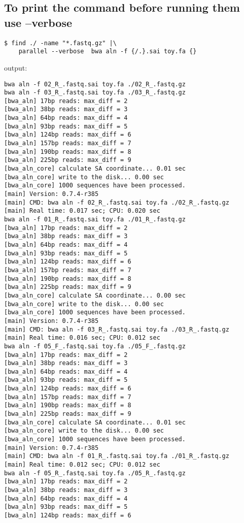 \documentclass{article}
\begin{document}
\subsection{To print the command before running them use --verbose}
\begin{lstlisting}
$ find ./ -name "*.fastq.gz" |\
	parallel --verbose  bwa aln -f {/.}.sai toy.fa {}
\end{lstlisting}
output:
\begin{lstlisting}
bwa aln -f 02_R_.fastq.sai toy.fa ./02_R_.fastq.gz
bwa aln -f 03_R_.fastq.sai toy.fa ./03_R_.fastq.gz
[bwa_aln] 17bp reads: max_diff = 2
[bwa_aln] 38bp reads: max_diff = 3
[bwa_aln] 64bp reads: max_diff = 4
[bwa_aln] 93bp reads: max_diff = 5
[bwa_aln] 124bp reads: max_diff = 6
[bwa_aln] 157bp reads: max_diff = 7
[bwa_aln] 190bp reads: max_diff = 8
[bwa_aln] 225bp reads: max_diff = 9
[bwa_aln_core] calculate SA coordinate... 0.01 sec
[bwa_aln_core] write to the disk... 0.00 sec
[bwa_aln_core] 1000 sequences have been processed.
[main] Version: 0.7.4-r385
[main] CMD: bwa aln -f 02_R_.fastq.sai toy.fa ./02_R_.fastq.gz
[main] Real time: 0.017 sec; CPU: 0.020 sec
bwa aln -f 01_R_.fastq.sai toy.fa ./01_R_.fastq.gz
[bwa_aln] 17bp reads: max_diff = 2
[bwa_aln] 38bp reads: max_diff = 3
[bwa_aln] 64bp reads: max_diff = 4
[bwa_aln] 93bp reads: max_diff = 5
[bwa_aln] 124bp reads: max_diff = 6
[bwa_aln] 157bp reads: max_diff = 7
[bwa_aln] 190bp reads: max_diff = 8
[bwa_aln] 225bp reads: max_diff = 9
[bwa_aln_core] calculate SA coordinate... 0.00 sec
[bwa_aln_core] write to the disk... 0.00 sec
[bwa_aln_core] 1000 sequences have been processed.
[main] Version: 0.7.4-r385
[main] CMD: bwa aln -f 03_R_.fastq.sai toy.fa ./03_R_.fastq.gz
[main] Real time: 0.016 sec; CPU: 0.012 sec
bwa aln -f 05_F_.fastq.sai toy.fa ./05_F_.fastq.gz
[bwa_aln] 17bp reads: max_diff = 2
[bwa_aln] 38bp reads: max_diff = 3
[bwa_aln] 64bp reads: max_diff = 4
[bwa_aln] 93bp reads: max_diff = 5
[bwa_aln] 124bp reads: max_diff = 6
[bwa_aln] 157bp reads: max_diff = 7
[bwa_aln] 190bp reads: max_diff = 8
[bwa_aln] 225bp reads: max_diff = 9
[bwa_aln_core] calculate SA coordinate... 0.01 sec
[bwa_aln_core] write to the disk... 0.00 sec
[bwa_aln_core] 1000 sequences have been processed.
[main] Version: 0.7.4-r385
[main] CMD: bwa aln -f 01_R_.fastq.sai toy.fa ./01_R_.fastq.gz
[main] Real time: 0.012 sec; CPU: 0.012 sec
bwa aln -f 05_R_.fastq.sai toy.fa ./05_R_.fastq.gz
[bwa_aln] 17bp reads: max_diff = 2
[bwa_aln] 38bp reads: max_diff = 3
[bwa_aln] 64bp reads: max_diff = 4
[bwa_aln] 93bp reads: max_diff = 5
[bwa_aln] 124bp reads: max_diff = 6

\end{lstlisting}
\end{document}
